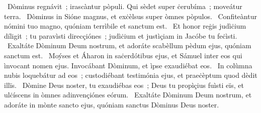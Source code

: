 ~Dòminus regnávit~; irascàntur pòpuli. Qui sèdet super ċerubíma~; moveátur terra. 
~Dòminus in Sióne magnus, et exċèlsus super òmnes pòpulos. 
~Confiteàntur nómini tuo magno, quóniam terrìbile et sanctum est. 
~Et honor reġis judìċium díligit~; tu paravìsti direcçiónes~; judìċium et justìçiam in Jacóbe tu feċìsti. 
~Exaltáte Dòminum Deum nostrum, et adoráte scabèllum pèdum ejus, quóniam sanctum est. 
~Moýses et Áharon in saċerdótibus ejus, et Sámuel inter eos qui ìnvocant nomen ejus. Invocábant Dòminum, et ìpse exaudiébat eos. 
~In colùmna nubis loquebátur ad eos~; custodiébant testimónia ejus, et praeċèptum quod dèdit illïs. 
~Dòmine Deus noster, tu exaudiébas eos~; Deus tu propìçius fuìsti eïs, et ulċíscens in òmnes adinvençiónes eórum. 
~Exaltáte Dòminum Deum nostrum, et adoráte in mònte sancto ejus, quóniam sanctus Dòminus Deus noster. 
